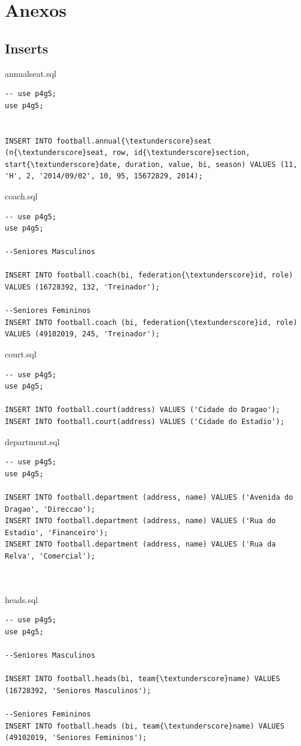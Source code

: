 \documentclass[pdftex,12pt,a4paper]{report}
\begin{document}
\newpage
\section{Anexos}
\subsection*{Inserts}
annual{\textunderscore}seat.sql
\begin{lstlisting} 
-- use p4g5;
use p4g5;


INSERT INTO football.annual{\textunderscore}seat (n{\textunderscore}seat, row, id{\textunderscore}section, start{\textunderscore}date, duration, value, bi, season) VALUES (11, 'H', 2, '2014/09/02', 10, 95, 15672829, 2014);

\end{lstlisting}

coach.sql
\begin{lstlisting} 
-- use p4g5;
use p4g5;

--Seniores Masculinos

INSERT INTO football.coach(bi, federation{\textunderscore}id, role) VALUES (16728392, 132, 'Treinador');

--Seniores Femininos
INSERT INTO football.coach (bi, federation{\textunderscore}id, role) VALUES (49102019, 245, 'Treinador');
\end{lstlisting}

court.sql
\begin{lstlisting} 
-- use p4g5;
use p4g5;

INSERT INTO football.court(address) VALUES ('Cidade do Dragao');
INSERT INTO football.court(address) VALUES ('Cidade do Estadio');

\end{lstlisting}

department.sql
\begin{lstlisting} 
-- use p4g5;
use p4g5;

INSERT INTO football.department (address, name) VALUES ('Avenida do Dragao', 'Direccao');
INSERT INTO football.department (address, name) VALUES ('Rua do Estadio', 'Financeiro');
INSERT INTO football.department (address, name) VALUES ('Rua da Relva', 'Comercial');



\end{lstlisting}

heads.sql
\begin{lstlisting} 
-- use p4g5;
use p4g5;

--Seniores Masculinos

INSERT INTO football.heads(bi, team{\textunderscore}name) VALUES (16728392, 'Seniores Masculinos');

--Seniores Femininos
INSERT INTO football.heads (bi, team{\textunderscore}name) VALUES (49102019, 'Seniores Femininos');
\end{lstlisting}
\end{document}
